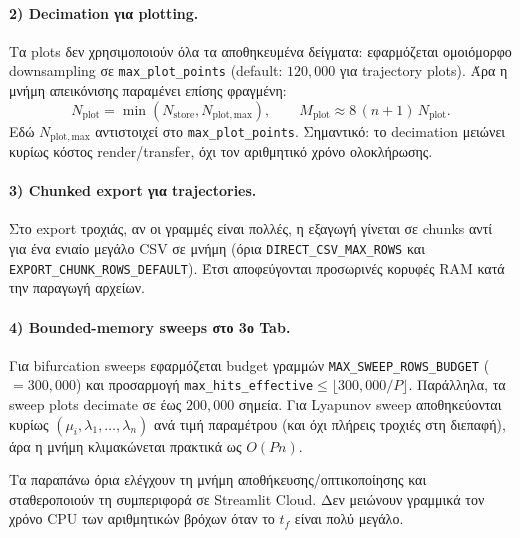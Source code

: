 \documentclass[11pt,a4paper]{report}
\begin{document}
\paragraph{2) Decimation για plotting.}
Τα plots δεν χρησιμοποιούν όλα τα αποθηκευμένα δείγματα: εφαρμόζεται ομοιόμορφο
downsampling σε \texttt{max\_plot\_points} (default: \(120{,}000\) για trajectory plots).
Άρα η μνήμη απεικόνισης παραμένει επίσης φραγμένη:
\[
N_{\mathrm{plot}}=\min\!\left(N_{\mathrm{store}},N_{\mathrm{plot,max}}\right),\qquad
M_{\mathrm{plot}} \approx 8\,(n+1)\,N_{\mathrm{plot}}.
\]
Εδώ \(N_{\mathrm{plot,max}}\) αντιστοιχεί στο \texttt{max\_plot\_points}.
Σημαντικό: το decimation μειώνει κυρίως κόστος render/transfer, όχι τον αριθμητικό
χρόνο ολοκλήρωσης.

\paragraph{3) Chunked export για trajectories.}
Στο export τροχιάς, αν οι γραμμές είναι πολλές, η εξαγωγή γίνεται σε chunks αντί για
ένα ενιαίο μεγάλο CSV σε μνήμη (όρια \texttt{DIRECT\_CSV\_MAX\_ROWS} και
\texttt{EXPORT\_CHUNK\_ROWS\_DEFAULT}). Έτσι αποφεύγονται προσωρινές κορυφές RAM κατά
την παραγωγή αρχείων.

\paragraph{4) Bounded-memory sweeps στο 3ο Tab.}
Για bifurcation sweeps εφαρμόζεται budget γραμμών
\texttt{MAX\_SWEEP\_ROWS\_BUDGET} (\(=300{,}000\)) και προσαρμογή
\texttt{max\_hits\_effective}\(\le \lfloor 300{,}000/P \rfloor\). Παράλληλα, τα sweep plots
decimate σε έως \(200{,}000\) σημεία. Για Lyapunov sweep αποθηκεύονται κυρίως
\((\mu_i,\lambda_1,\ldots,\lambda_n)\) ανά τιμή παραμέτρου (και όχι πλήρεις τροχιές
στη διεπαφή), άρα η μνήμη κλιμακώνεται πρακτικά ως \(O(Pn)\).

\begin{importantbox}
Τα παραπάνω όρια ελέγχουν τη μνήμη αποθήκευσης/οπτικοποίησης και σταθεροποιούν τη
συμπεριφορά σε Streamlit Cloud. Δεν μειώνουν γραμμικά τον χρόνο CPU των αριθμητικών
βρόχων όταν το \(t_f\) είναι πολύ μεγάλο.
\end{importantbox}
\end{document}
